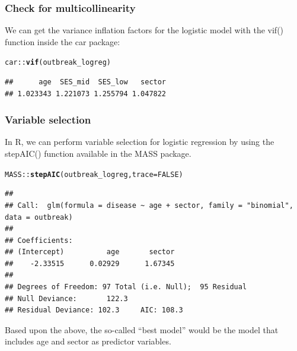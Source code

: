 \documentclass{article}\usepackage[]{graphicx}\usepackage[]{color}
\makeatletter
\newcommand{\hlnum}[1]{\textcolor[rgb]{0.686,0.059,0.569}{#1}}%
\newcommand{\hlopt}[1]{\textcolor[rgb]{0,0,0}{#1}}%
\newcommand{\hlstd}[1]{\textcolor[rgb]{0.345,0.345,0.345}{#1}}%
\newcommand{\hlkwc}[1]{\textcolor[rgb]{0.333,0.667,0.333}{#1}}%
\newcommand{\hlkwd}[1]{\textcolor[rgb]{0.737,0.353,0.396}{\textbf{#1}}}%
\newenvironment{kframe}{%
 \def\at@end@of@kframe{}%
 \ifinner\ifhmode%
  \def\at@end@of@kframe{\end{minipage}}%
  \begin{minipage}{\columnwidth}%
 \fi\fi%
 \def\FrameCommand##1{\hskip\@totalleftmargin \hskip-\fboxsep
 \colorbox{shadecolor}{##1}\hskip-\fboxsep
     \hskip-\linewidth \hskip-\@totalleftmargin \hskip\columnwidth}%
 \MakeFramed {\advance\hsize-\width
   \@totalleftmargin\z@ \linewidth\hsize
   \@setminipage}}%
 {\par\unskip\endMakeFramed%
 \at@end@of@kframe}
\newenvironment{knitrout}{}{} %
\makeatother
\begin{document}
\subsubsection*{Check for multicollinearity}

We can get the variance inflation factors for the logistic model with the vif() function inside the car package:

\begin{knitrout}
\color{fgcolor}\begin{kframe}
\begin{alltt}
\hlstd{car}\hlopt{::}\hlkwd{vif}\hlstd{(outbreak_logreg)}
\end{alltt}
\begin{verbatim}
##      age  SES_mid  SES_low   sector 
## 1.023343 1.221073 1.255794 1.047822
\end{verbatim}
\end{kframe}
\end{knitrout}

\subsubsection*{Variable selection}

In R, we can perform variable selection for logistic regression by using the stepAIC() function available in the MASS package.

\begin{knitrout}
\color{fgcolor}\begin{kframe}
\begin{alltt}
\hlstd{MASS}\hlopt{::}\hlkwd{stepAIC}\hlstd{(outbreak_logreg,} \hlkwc{trace} \hlstd{=} \hlnum{FALSE}\hlstd{)}
\end{alltt}
\begin{verbatim}
## 
## Call:  glm(formula = disease ~ age + sector, family = "binomial", data = outbreak)
## 
## Coefficients:
## (Intercept)          age       sector  
##    -2.33515      0.02929      1.67345  
## 
## Degrees of Freedom: 97 Total (i.e. Null);  95 Residual
## Null Deviance:	    122.3 
## Residual Deviance: 102.3 	AIC: 108.3
\end{verbatim}
\end{kframe}
\end{knitrout}

Based upon the above, the so-called ``best model'' would be the model that includes age and sector as predictor variables.
\end{document}
